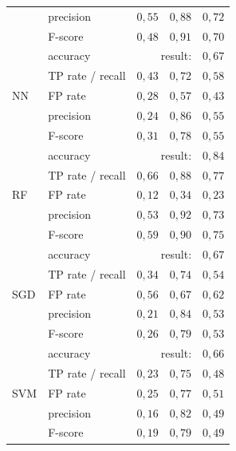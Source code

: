 \begin{table}[t]
\begin{tabular}{@{}llrrr@{}}
                     & precision        & $0,55$         & $0,88$     & $0,72$ \\
                     & F-score          & $0,48$         & $0,91$     & $0,70$ \\ \midrule
\multirow{5}{*}{NN}  & accuracy         & \multicolumn{2}{r}{result:} & $0,67$ \\
                     & TP rate / recall & $0,43$         & $0,72$     & $0,58$ \\
                     & FP rate          & $0,28$         & $0,57$     & $0,43$ \\
                     & precision        & $0,24$         & $0,86$     & $0,55$ \\
                     & F-score          & $0,31$         & $0,78$     & $0,55$ \\ \midrule
\multirow{5}{*}{RF}  & accuracy         & \multicolumn{2}{r}{result:} & $0,84$ \\
                     & TP rate / recall & $0,66$         & $0,88$     & $0,77$ \\
                     & FP rate          & $0,12$         & $0,34$     & $0,23$ \\
                     & precision        & $0,53$         & $0,92$     & $0,73$ \\
                     & F-score          & $0,59$         & $0,90$     & $0,75$ \\ \midrule
\multirow{5}{*}{SGD} & accuracy         & \multicolumn{2}{r}{result:} & $0,67$ \\
                     & TP rate / recall & $0,34$         & $0,74$     & $0,54$ \\
                     & FP rate          & $0,56$         & $0,67$     & $0,62$ \\
                     & precision        & $0,21$         & $0,84$     & $0,53$ \\
                     & F-score          & $0,26$         & $0,79$     & $0,53$ \\ \midrule
\multirow{5}{*}{SVM} & accuracy         & \multicolumn{2}{r}{result:} & $0,66$ \\
                     & TP rate / recall & $0,23$         & $0,75$     & $0,48$ \\
                     & FP rate          & $0,25$         & $0,77$     & $0,51$ \\
                     & precision        & $0,16$         & $0,82$     & $0,49$ \\
                     & F-score          & $0,19$         & $0,79$     & $0,49$ \\ \bottomrule
\end{tabular}
\end{table}

